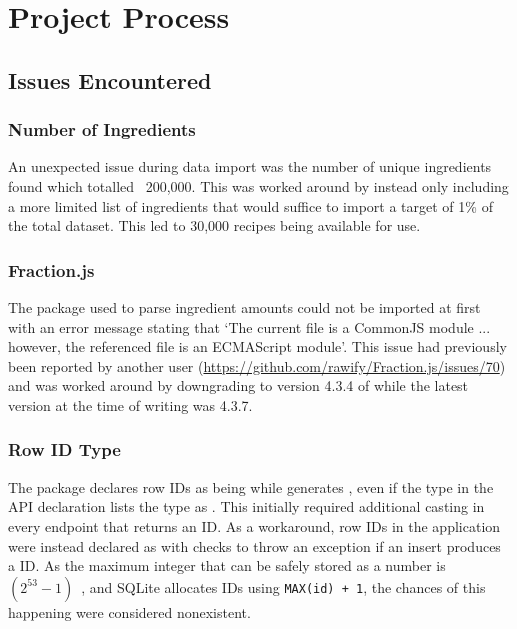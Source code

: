 \section{Project Process}

\subsection{Issues Encountered}

\subsubsection{Number of Ingredients}
An unexpected issue during data import was the number of unique ingredients found which totalled ~200,000. This was worked
around by instead only including a more limited list of ingredients that would suffice to import a target of 1\% of
the total dataset. This led to 30,000 recipes being available for use.

\subsubsection{Fraction.js}
The  package used to parse ingredient amounts could not be imported at first with an error message
stating that \enquote*{The current file is a CommonJS module ... however, the referenced file is an ECMAScript module}.
This issue had previously been reported by another user (\href{https://github.com/rawify/Fraction.js/issues/70}{https://github.com/rawify/Fraction.js/issues/70})
and was worked around by downgrading to version 4.3.4 of  while the latest version at the time
of writing was 4.3.7.

\subsubsection{Row ID Type}
The  package declares row IDs as being 
while  generates , even if the type in the API
declaration lists the type as . This initially required additional casting in every endpoint
that returns an ID. As a workaround, row IDs in the application were instead declared as 
with checks to throw an exception if an insert produces a  ID. As the maximum integer that can be safely stored as a number is
$(2^{53} - 1)$~\cite{noauthor_numbermax_safe_integer_2023}, and SQLite allocates IDs using \texttt{MAX(id) + 1},
the chances of this happening were considered nonexistent.


